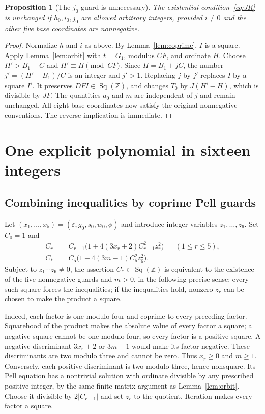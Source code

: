 \documentclass[11pt]{article}
\newtheorem{proposition}[theorem]{Proposition}
\theoremstyle{definition}\newtheorem{definition}[theorem]{Definition}
\newcommand{\Z}{\mathbb Z}\newcommand{\N}{\mathbb N}\newcommand{\Q}{\mathbb Q}
\newcommand{\Sq}{\operatorname{Sq}(\Z)}
\begin{document}
\begin{proposition}[The $j_0$ guard is unnecessary]\label{prop:jguard}
The existential condition~\eqref{eq:JR} is unchanged if $h_0,i_0,j_0$ are allowed arbitrary integers, provided $i\ne0$ and the other five base coordinates are nonnegative.
\end{proposition}
\begin{proof}
Normalize $h$ and $i$ as above. By Lemma~\ref{lem:coprime}, $I$ is a square. Apply Lemma~\ref{lem:orbit} with $t=G_1$, modulus $CF$, and ordinate $H$. Choose $H'>B_1+C$ and $H'\equiv H\pmod{CF}$.
Since $H=B_1+jC$, the number $j'=(H'-B_1)/C$ is an integer and $j'>1$. Replacing $j$ by $j'$ replaces $I$ by a square $I'$. It preserves $DFI\in\Sq$, and changes $T_0$ by $J(H'-H)$, which is divisible by $JF$. The quantities $a_0$ and $m$ are independent of $j$ and remain unchanged. All eight base coordinates now satisfy the original nonnegative conventions. The reverse implication is immediate.
\end{proof}

\section{One explicit polynomial in sixteen integers}\label{sec:sixteen}
\subsection{Combining inequalities by coprime Pell guards}
Let $(x_1,\ldots,x_5)=(\varepsilon,g_0,s_0,w_0,\phi)$ and introduce integer variables $z_1,\ldots,z_6$. Set $C_0=1$ and
\begin{align}
 C_r&=C_{r-1}\bigl(1+4(3x_r+2)C_{r-1}^2z_r^2\bigr)
       &&(1\le r\le5),\nonumber\\
 C_*&=C_5\bigl(1+4(3m-1)C_5^2z_6^2\bigr).\label{eq:guards16}
\end{align}
Subject to $z_1\cdots z_6\ne0$, the assertion $C_*\in\Sq$ is equivalent to the existence of the five nonnegative guards and $m>0$, in the following precise sense: every such square forces the inequalities; if the inequalities hold, nonzero $z_r$ can be chosen to make the product a square.

Indeed, each factor is one modulo four and coprime to every preceding factor. Squarehood of the product makes the absolute value of every factor a square; a negative square cannot be one modulo four, so every factor is a positive square. A negative discriminant $3x_r+2$ or $3m-1$ would make its factor negative. These discriminants are two modulo three and cannot be zero. Thus $x_r\ge0$ and $m\ge1$.
Conversely, each positive discriminant is two modulo three, hence nonsquare. Its Pell equation has a nontrivial solution with ordinate divisible by any prescribed positive integer, by the same finite-matrix argument as Lemma~\ref{lem:orbit}. Choose it divisible by $2|C_{r-1}|$ and set $z_r$ to the quotient. Iteration makes every factor a square.
\end{document}

